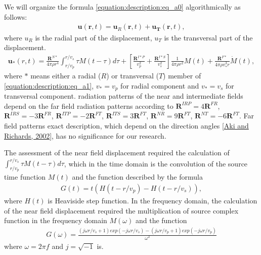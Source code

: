\documentclass[letterpaper,10pt,english]{sphinxmanual}
\begin{document}
\sphinxAtStartPar
We will organize the formula \eqref{equation:description:eq_a0} algorithmically as follows:
\begin{equation}\label{equation:description:eq_a1}
\begin{split}\mathbf{u}\left ( \mathbf{r},t \right )=
\mathbf{u}_R\left ( \mathbf{r},t \right )+
\mathbf{u_T}\left ( \mathbf{r},t \right ),\end{split}
\end{equation}
\sphinxAtStartPar
where \(u_R\) is the radial part of the displacement, \(u_T\) is the transversal part of the displacement.
\begin{equation}\label{equation:description:eq_a2}
\begin{split}\mathbf{\mathbf{u}}_* \left(r, t \right) =
\frac{\mathbf{R}^{N*}}{4\pi\rho r^4}\int_{r/v_p}^{r/v_s}\tau M\left( t-\tau \right)d\tau
+ \left[ \frac{\mathbf{R}^{I*P}}{v_p^2} + \frac{\mathbf{R}^{I*S}}{v_s^2} \right]
\frac{1}{4\pi\rho r^2}M\left( t \right)
+\frac{\mathbf{R}^{F*}}{4\pi\rho v_*^3 r } \dot{M}\left( t \right),\end{split}
\end{equation}
\sphinxAtStartPar
where \(*\) means either a radial (\(R\)) or transversal (\(T\)) member of \eqref{equation:description:eq_a1},
\(v_*=v_p\) for radial component and \(v_*=v_s\) for transversal component.
radiation patterns of the near and intermediate fields depend on the far field radiation patterns according to
\(\mathbf{R}^{IRP}= 4\mathbf{R}^{FR}\), \(\mathbf{R}^{IRS}= -3\mathbf{R}^{FR}\),
\(\mathbf{R}^{ITP}= -2\mathbf{R}^{FT}\), \(\mathbf{R}^{ITS}= 3\mathbf{R}^{FT}\),
\(\mathbf{R}^{NR}= 9\mathbf{R}^{FT}\), \(\mathbf{R}^{NT}= -6\mathbf{R}^{FT}\).
Far field patterns exact description,
which depend on the direction angles {[}\hyperlink{cite.bibliography:id11}{Aki and Richards, 2002}{]},
has no significance for our research.

\sphinxAtStartPar
The assessment of the near field displacement required the calculation of
\(\int_{r/v_p}^{r/v_s}\tau M\left( t-\tau \right)d\tau\),
which in the time domain is the convolution of the source time function
\(M\left( t \right)\) and the function described by the formula
\begin{equation}\label{equation:description:eq_a3}
\begin{split}G\left( t \right) = t(H(t-r/v_p) - H(t-r/v_s)),\end{split}
\end{equation}
\sphinxAtStartPar
where \(H\left( t \right)\) is Heaviside step function.
In the frequency domain, the calculation of the near field displacement required the multiplication of
source complex function in the frequency domain \(M\left( \omega \right)\) and the function
\begin{equation}\label{equation:description:eq_a4}
\begin{split}G\left( \omega \right) = \frac{\left(j\omega r/v_s+1\right)exp\left(-j\omega r/v_s\right)
-\left(j\omega r/v_p+1\right)exp\left(-j\omega r/v_p\right)}{\omega ^2}\end{split}
\end{equation}
\sphinxAtStartPar
where \(\omega=2\pi f\) and \(j=\sqrt{-1}\) is.
\end{document}
